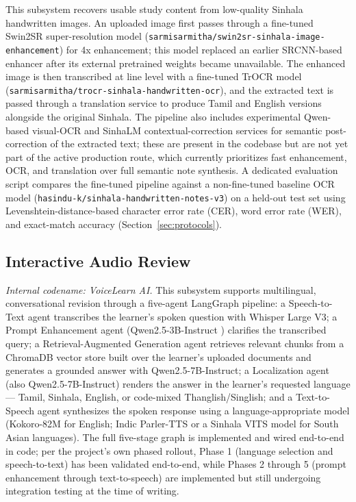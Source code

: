 \documentclass[conference]{IEEEtran}
\begin{document}
This subsystem recovers usable study content from low-quality Sinhala handwritten images. An uploaded image first passes through a fine-tuned Swin2SR super-resolution model (\texttt{sarmisarmitha/swin2sr-sinhala-image-enhancement}) for 4x enhancement; this model replaced an earlier SRCNN-based enhancer after its external pretrained weights became unavailable. The enhanced image is then transcribed at line level with a fine-tuned TrOCR model (\texttt{sarmisarmitha/trocr-sinhala-handwritten-ocr}), and the extracted text is passed through a translation service to produce Tamil and English versions alongside the original Sinhala. The pipeline also includes experimental Qwen-based visual-OCR and SinhaLM contextual-correction services for semantic post-correction of the extracted text; these are present in the codebase but are not yet part of the active production route, which currently prioritizes fast enhancement, OCR, and translation over full semantic note synthesis. A dedicated evaluation script compares the fine-tuned pipeline against a non-fine-tuned baseline OCR model (\texttt{hasindu-k/sinhala-handwritten-notes-v3}) on a held-out test set using Levenshtein-distance-based character error rate (CER), word error rate (WER), and exact-match accuracy (Section~\ref{sec:protocols}).

\subsection{Interactive Audio Review}
\label{sec:audio}

\emph{Internal codename: VoiceLearn AI.} This subsystem supports multilingual, conversational revision through a five-agent LangGraph pipeline: a Speech-to-Text agent transcribes the learner's spoken question with Whisper Large V3; a Prompt Enhancement agent (Qwen2.5-3B-Instruct \cite{qwen25}) clarifies the transcribed query; a Retrieval-Augmented Generation agent retrieves relevant chunks from a ChromaDB vector store built over the learner's uploaded documents and generates a grounded answer with Qwen2.5-7B-Instruct; a Localization agent (also Qwen2.5-7B-Instruct) renders the answer in the learner's requested language --- Tamil, Sinhala, English, or code-mixed Thanglish/Singlish; and a Text-to-Speech agent synthesizes the spoken response using a language-appropriate model (Kokoro-82M for English; Indic Parler-TTS or a Sinhala VITS model for South Asian languages). The full five-stage graph is implemented and wired end-to-end in code; per the project's own phased rollout, Phase 1 (language selection and speech-to-text) has been validated end-to-end, while Phases 2 through 5 (prompt enhancement through text-to-speech) are implemented but still undergoing integration testing at the time of writing.
\end{document}

